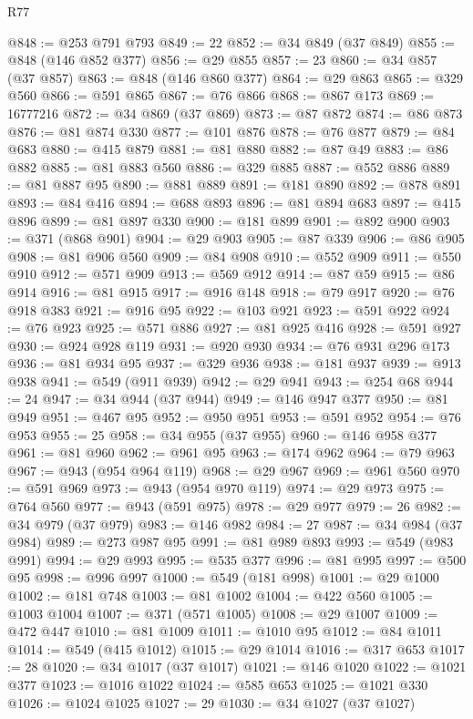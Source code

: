 \begin{lexlean}{R77}
\begin{coremodule}
@848 := @253 @791 @793
@849 := 22
@852 := @34 @849 (@37 @849)
@855 := @848 (@146 @852 @377)
@856 := @29 @855
@857 := 23
@860 := @34 @857 (@37 @857)
@863 := @848 (@146 @860 @377)
@864 := @29 @863
@865 := @329 @560
@866 := @591 @865
@867 := @76 @866
@868 := @867 @173
@869 := 16777216
@872 := @34 @869 (@37 @869)
@873 := @87 @872
@874 := @86 @873
@876 := @81 @874 @330
@877 := @101 @876
@878 := @76 @877
@879 := @84 @683
@880 := @415 @879
@881 := @81 @880
@882 := @87 @49
@883 := @86 @882
@885 := @81 @883 @560
@886 := @329 @885
@887 := @552 @886
@889 := @81 @887 @95
@890 := @881 @889
@891 := @181 @890
@892 := @878 @891
@893 := @84 @416
@894 := @688 @893
@896 := @81 @894 @683
@897 := @415 @896
@899 := @81 @897 @330
@900 := @181 @899
@901 := @892 @900
@903 := @371 (@868 @901)
@904 := @29 @903
@905 := @87 @339
@906 := @86 @905
@908 := @81 @906 @560
@909 := @84 @908
@910 := @552 @909
@911 := @550 @910
@912 := @571 @909
@913 := @569 @912
@914 := @87 @59
@915 := @86 @914
@916 := @81 @915
@917 := @916 @148
@918 := @79 @917
@920 := @76 @918 @383
@921 := @916 @95
@922 := @103 @921
@923 := @591 @922
@924 := @76 @923
@925 := @571 @886
@927 := @81 @925 @416
@928 := @591 @927
@930 := @924 @928 @119
@931 := @920 @930
@934 := @76 @931 @296 @173
@936 := @81 @934 @95
@937 := @329 @936
@938 := @181 @937
@939 := @913 @938
@941 := @549 (@911 @939)
@942 := @29 @941
@943 := @254 @68
@944 := 24
@947 := @34 @944 (@37 @944)
@949 := @146 @947 @377
@950 := @81 @949
@951 := @467 @95
@952 := @950 @951
@953 := @591 @952
@954 := @76 @953
@955 := 25
@958 := @34 @955 (@37 @955)
@960 := @146 @958 @377
@961 := @81 @960
@962 := @961 @95
@963 := @174 @962
@964 := @79 @963
@967 := @943 (@954 @964 @119)
@968 := @29 @967
@969 := @961 @560
@970 := @591 @969
@973 := @943 (@954 @970 @119)
@974 := @29 @973
@975 := @764 @560
@977 := @943 (@591 @975)
@978 := @29 @977
@979 := 26
@982 := @34 @979 (@37 @979)
@983 := @146 @982
@984 := 27
@987 := @34 @984 (@37 @984)
@989 := @273 @987 @95
@991 := @81 @989 @893
@993 := @549 (@983 @991)
@994 := @29 @993
@995 := @535 @377
@996 := @81 @995
@997 := @500 @95
@998 := @996 @997
@1000 := @549 (@181 @998)
@1001 := @29 @1000
@1002 := @181 @748
@1003 := @81 @1002
@1004 := @422 @560
@1005 := @1003 @1004
@1007 := @371 (@571 @1005)
@1008 := @29 @1007
@1009 := @472 @447
@1010 := @81 @1009
@1011 := @1010 @95
@1012 := @84 @1011
@1014 := @549 (@415 @1012)
@1015 := @29 @1014
@1016 := @317 @653
@1017 := 28
@1020 := @34 @1017 (@37 @1017)
@1021 := @146 @1020
@1022 := @1021 @377
@1023 := @1016 @1022
@1024 := @585 @653
@1025 := @1021 @330
@1026 := @1024 @1025
@1027 := 29
@1030 := @34 @1027 (@37 @1027)

\end{coremodule}
\end{lexlean}
